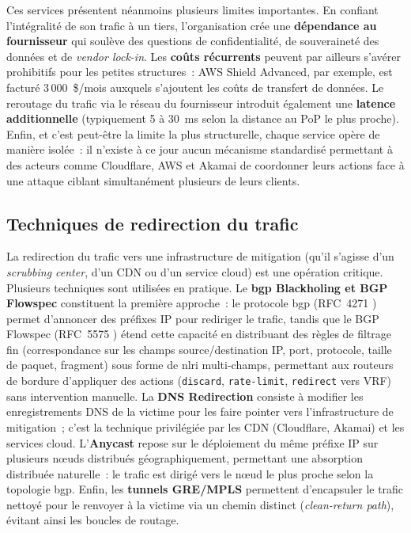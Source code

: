 Ces services présentent néanmoins plusieurs limites importantes. En confiant l'intégralité de son trafic à un tiers, l'organisation crée une \textbf{dépendance au fournisseur} qui soulève des questions de confidentialité, de souveraineté des données et de \textit{vendor lock-in}. Les \textbf{coûts récurrents} peuvent par ailleurs s'avérer prohibitifs pour les petites structures~: AWS Shield Advanced, par exemple, est facturé 3\,000~\$/mois auxquels s'ajoutent les coûts de transfert de données. Le reroutage du trafic via le réseau du fournisseur introduit également une \textbf{latence additionnelle} (typiquement 5 à 30~ms selon la distance au PoP le plus proche). Enfin, et c'est peut-être la limite la plus structurelle, chaque service opère de manière isolée~: il n'existe à ce jour aucun mécanisme standardisé permettant à des acteurs comme Cloudflare, AWS et Akamai de coordonner leurs actions face à une attaque ciblant simultanément plusieurs de leurs clients.

\subsection{Techniques de redirection du trafic}

La redirection du trafic vers une infrastructure de mitigation (qu'il s'agisse d'un \textit{scrubbing center}, d'un CDN ou d'un service cloud) est une opération critique. Plusieurs techniques sont utilisées en pratique. Le \textbf{\gls{bgp} Blackholing et BGP Flowspec} constituent la première approche~: le protocole \gls{bgp} (RFC~4271 \parencite{rekhter2006bgp}) permet d'annoncer des préfixes IP pour rediriger le trafic, tandis que le BGP Flowspec (RFC~5575 \parencite{marques2009flowspec}) étend cette capacité en distribuant des règles de filtrage fin (correspondance sur les champs source/destination IP, port, protocole, taille de paquet, fragment) sous forme de \gls{nlri} multi-champs, permettant aux routeurs de bordure d'appliquer des actions (\texttt{discard}, \texttt{rate-limit}, \texttt{redirect} vers VRF) sans intervention manuelle. La \textbf{DNS Redirection} consiste à modifier les enregistrements DNS de la victime pour les faire pointer vers l'infrastructure de mitigation~; c'est la technique privilégiée par les CDN (Cloudflare, Akamai) et les services cloud. L'\textbf{Anycast} repose sur le déploiement du même préfixe IP sur plusieurs n\oe{}uds distribués géographiquement, permettant une absorption distribuée naturelle~: le trafic est dirigé vers le n\oe{}ud le plus proche selon la topologie \gls{bgp}. Enfin, les \textbf{tunnels GRE/MPLS} permettent d'encapsuler le trafic nettoyé pour le renvoyer à la victime via un chemin distinct (\textit{clean-return path}), évitant ainsi les boucles de routage.

